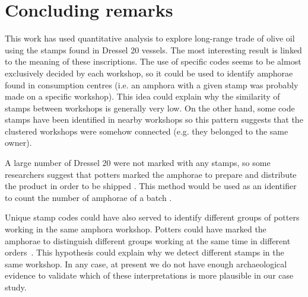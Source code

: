 \documentclass[review]{elsarticle}
\newcommand{\memo}[2]{\textcolor{#1}{#2}}
\newcommand{\xavi}[1]{\memo{magenta}{XRC: #1\\}}
\begin{document}


\section{Concluding remarks}

This work has used quantitative analysis to explore long-range trade of olive oil using the stamps found in Dressel 20 vessels. The most interesting result is linked to the meaning of these inscriptions. The use of specific codes seems to be almost exclusively decided by each workshop, so it could be used to identify amphorae found in consumption centres (i.e. an amphora with a given stamp was probably made on a specific workshop). This idea could explain why the similarity of stamps between workshops is generally very low. On the other hand, some code stamps have been identified in nearby workshops so this pattern suggests that the clustered workshops were somehow connected (e.g. they belonged to the same owner).



A large number of Dressel 20 were not marked with any stamps, so some researchers suggest that potters marked the amphorae to prepare and distribute the product in order to be shipped \citep{berni_millet_epigrafianforica_2008}. This method would be used as an identifier to count the number of amphorae of a batch \citep{juanmorostesis}. 

Unique stamp codes could have also served to identify different groups of potters working in the same amphora workshop. Potters could have marked the amphorae to distinguish different groups working at the same time in different orders~\citep{li_crossbows_2014}. This hypothesis could explain why we detect different stamps in the same workshop. In any case, at present we do not have enough archaeological evidence to validate which of these interpretations is more plausible in our case study.
\end{document}
